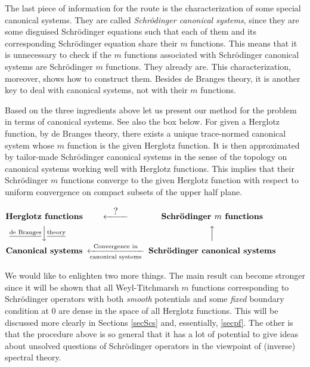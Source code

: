 \documentclass[preprint,12pt]{elsarticle}
\begin{document}
The last piece of information for the route is the characterization of some special canonical systems. They are called \textit{Schr\"odinger canonical systems}, since they are some disguised Schr\"odinger equations such that each of them and its corresponding Schr\"odinger equation share their $m$ functions. This means that it is unnecessary to check if the $m$ functions associated with Schr\"odinger canonical systems are Schr\"odinger $m$ functions. They already are. This characterization, moreover, shows how to construct them. Besides de Branges theory, it is another key to deal with canonical systems, not with their $m$ functions. 

Based on the three ingredients above let us present our method for the problem in terms of canonical systems. 
See also the box below. For given a Herglotz function, by de Branges theory, there exists a unique trace-normed canonical system whose $m$ function is the given Herglotz function. It is then approximated by tailor-made Schr\"odinger canonical systems in the sense of the topology on canonical systems working well with Herglotz functions. This implies that their Schr\"odinger $m$ functions  converge to the given Herglotz function with respect to uniform convergence on compact subsets of the upper half plane.


\begin{framed}
\begin{center}
\small{
$\begin{CD}
\textbf{Herglotz functions}    @<\textrm{\large{?}}<<  \textbf{Schr\"odinger $m$ functions}\\
@V\textrm{\underline{de Branges}}V\textrm{\underline{theory}}V @AAA\\
\textbf{Canonical systems}   @<\textrm{Convergence in}<\textrm{canonical systems}<   \textbf{Schr\"odinger canonical systems}
\end{CD}$
}
\end{center}
\end{framed}


We would like to enlighten two more things. The main result can become stronger since it will be shown that all Weyl-Titchmarsh $m$ functions corresponding to Schr\"odinger operators with both \textit{smooth} potentials and  some \textit{fixed} boundary condition at 0 are dense in the space of all Herglotz functions. This will be discussed more clearly in Sections \ref{secScs} and, essentially,  \ref{secpf}. The other is that the procedure above is so general that it has a lot of potential to give ideas about unsolved questions of Schr\"odinger operators in the viewpoint of (inverse) spectral theory.\\
\end{document}

